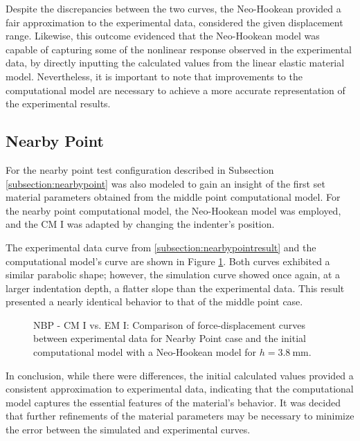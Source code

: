 Despite the discrepancies between the two curves, the Neo-Hookean provided a fair approximation to the experimental data, considered the 
given displacement range. Likewise, this outcome evidenced that the Neo-Hookean model was capable of capturing some of the nonlinear 
response observed in the experimental data, by directly inputting the calculated values from the linear elastic material model.
Nevertheless, it is important to note that improvements to the computational model are necessary to achieve a more
accurate representation of the experimental results.

\subsection{Nearby Point}
For the nearby point test configuration described in Subsection \ref{subsection:nearbypoint} was also modeled to gain an insight 
of the first set material parameters obtained from the middle point computational model.
For the nearby point computational model, the Neo-Hookean model was employed, and the CM I was adapted by changing the 
indenter's position.

The experimental data curve from \ref{subsection:nearbypointresult} and the computational model's curve are shown in Figure 
\ref{fig:nbpointIvsCPINBNH}. Both curves exhibited a similar parabolic shape; however, the simulation curve showed once again,
at a larger indentation depth, a flatter slope than the experimental data. This result presented a 
nearly identical behavior to that of the middle point case.\\
\label{subsection:nbpcpI}
\begin{figure}%
    \centering
   \quad
   \caption[Nearby Point: CM I vs. Experimental data - Neo-Hookean]{NBP - CM I vs. EM I: Comparison of force-displacement curves between experimental data for Nearby Point case and the initial computational model with a Neo-Hookean model for $h = \SI{3.8}{\milli \meter}$.}%
   \label{fig:nbpointIvsCPINBNH}%
\end{figure}
In conclusion, while there were differences, the initial calculated values provided a consistent approximation to experimental
data, indicating that the computational model captures the essential features of the material's behavior.
It was decided that further refinements of the material parameters may be necessary to minimize the error between the 
simulated and experimental curves.

